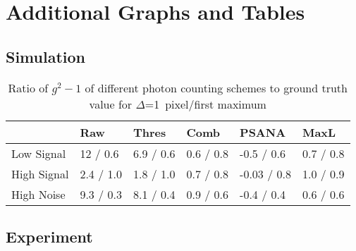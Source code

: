 \chapter{Additional Graphs and Tables}
\section{Simulation}
\begin{table}
	\caption{Ratio of $g^2-1$ of different photon counting schemes to ground truth value  for $\Delta$=1\, pixel/first maximum}
	\begin{tabular}{llllll}
		
		\toprule
		{} &           Raw &        Thres &         Comb &         PSANA &         MaxL \\
		\midrule
		Low Signal  &  12 / 0.6 &  6.9 / 0.6 &  0.6 / 0.8 &   -0.5 / 0.6 &  0.7 / 0.8 \\
		High Signal &    2.4 / 1.0 &  1.8 / 1.0 &  0.7 / 0.8 &  -0.03 / 0.8 &  1.0 / 0.9 \\
		High Noise  &    9.3 / 0.3 &  8.1 / 0.4 &  0.9 / 0.6 &  -0.4 / 0.4 &  0.6 / 0.6 \\
		\bottomrule
	\end{tabular}
\end{table}
\section{Experiment}

